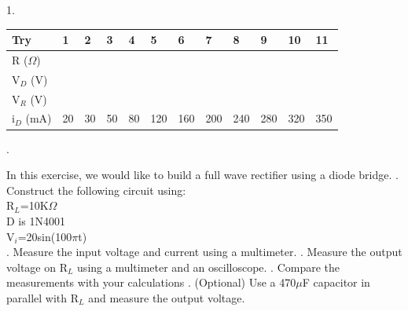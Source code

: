 {	\begin{solution}
		1.
		\begin{table}[h]
			\begin{tabular}{| l | l | l | l | l | l | l | l | l | l | l | l |}
				\hline
				Try          & 1 & 2 & 3 & 4 & 5 & 6 & 7 & 8 & 9 & 10 & 11 \\ \hline
				R (\(\Omega\))   &   &   &   &   &   &   &   &   &   &    &    \\ \hline
				V$_{D}$ (V)  &   &   &   &   &   &   &   &   &   &    &    \\ \hline
				V$_{R}$ (V)  &   &   &   &   &   &   &   &   &   &    &    \\ \hline
				i$_{D}$ (mA) & 20 & 30 & 50 & 80 & 120 & 160 & 200 & 240 & 280 & 320 & 350 \\ \hline
			\end{tabular}
		\end{table}
		.
	\end{solution}
	\clearpage
	\begin{problem}
		In this exercise, we would like to build a full wave rectifier using a diode bridge.
		. Construct the following circuit using:\\
		R\(_{L}\)=10K\(\Omega\)\\
		D is 1N4001\\
		V\(_{i}\)=20sin(100\(\pi\)t)\\
		. Measure the input voltage and current using a multimeter.
		. Measure the output voltage on R\(_{L}\) using a multimeter and an oscilloscope.
		. Compare the measurements with your calculations
		. (Optional) Use a 470\(\mu\)F capacitor in parallel with R\(_{L}\) and measure the output voltage.

	\end{problem}
	
}

